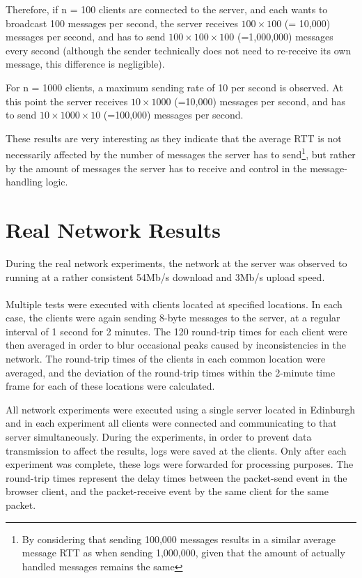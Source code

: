 \documentclass[bsc, 12pt, twoside, singlespacing, parskip, abbrevs, notimes, normalheadings, logo]{styles/infthesis}
\begin{document}
Therefore, if n = 100 clients are connected to the server, and each wants to broadcast 100 messages per second, the server receives $100 \times 100$ (= 10,000) messages per second, and has to send $100 \times 100 \times 100$ (=1,000,000) messages every second (although the sender technically does not need to re-receive its own message, this difference is negligible).

For n = 1000 clients, a maximum sending rate of 10 per second is observed. At this point the server receives $10 \times 1000$ (=10,000) messages per second, and has to send $10 \times 1000 \times 10$ (=100,000) messages per second.

These results are very interesting as they indicate that the average RTT is not necessarily affected by the number of messages the server has to send\footnote{By considering that sending 100,000 messages results in a similar average message RTT as when sending 1,000,000, given that the amount of actually handled messages remains the same}, but rather by the amount of messages the server has to receive and control in the message-handling logic.


\section{Real Network Results}
During the real network experiments, the network at the server was observed to running at a rather consistent 54Mb/s download and 3Mb/s upload speed.

\paragraph*{}Multiple tests were executed with clients located at specified locations. In each case, the clients were again sending 8-byte messages to the server, at a regular interval of 1 second for 2 minutes. The 120 round-trip times for each client were then averaged in order to blur occasional peaks caused by inconsistencies in the network. The round-trip times of the clients in each common location were averaged, and the deviation of the round-trip times within the 2-minute time frame for each of these locations were calculated.

All network experiments were executed using a single server located in Edinburgh and in each experiment all clients were connected and communicating to that server simultaneously. During the experiments, in order to prevent data transmission to affect the results, logs were saved at the clients. Only after each experiment was complete, these logs were forwarded for processing purposes. The round-trip times represent the delay times between the packet-send event in the browser client, and the packet-receive event by the same client for the same packet.
\end{document}
